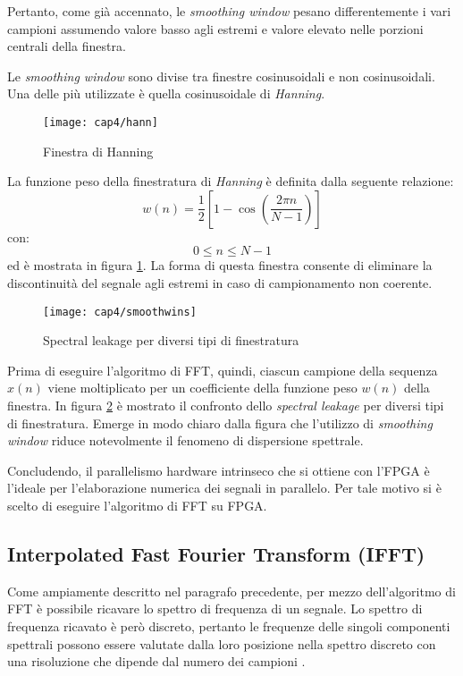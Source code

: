 Pertanto, come già accennato, le \textit{smoothing window} pesano differentemente i vari campioni assumendo valore basso agli estremi e valore elevato nelle porzioni centrali della finestra.

Le \textit{smoothing window} sono divise tra finestre cosinusoidali e non cosinusoidali. Una delle più utilizzate è quella cosinusoidale di \textit{Hanning}.
\begin{figure}[H]
  \begin{center}
    \texttt{[image: cap4/hann]}
    \caption{Finestra di Hanning}
    \label{hann}
  \end{center}
\end{figure}

La funzione peso della finestratura di \textit{Hanning} è definita dalla seguente relazione:
\begin{equation}
	w(n) = \frac{1}{2} \left [  1 - \cos \left ( \frac{2 \pi n}{N - 1} \right ) \right ]
\end{equation}
con:
$$ 0 \leq n \leq N-1 $$
ed è mostrata in figura \ref{hann}. La forma di questa finestra consente di eliminare la discontinuità del segnale agli estremi in caso di campionamento non coerente. 
\begin{figure}[H] 
  \begin{center}
    \texttt{[image: cap4/smoothwins]}
    \caption{Spectral leakage per diversi tipi di finestratura}
    \label{smoothwins}
  \end{center}
\end{figure}

Prima di eseguire l'algoritmo di FFT, quindi, ciascun campione della sequenza $x(n)$ viene moltiplicato per un coefficiente della funzione peso $w(n)$ della finestra. 
In figura \ref{smoothwins} è mostrato il confronto dello \textit{spectral leakage} per diversi tipi di finestratura. Emerge in modo chiaro dalla figura che l'utilizzo di \textit{smoothing window} riduce notevolmente il fenomeno di dispersione spettrale.

Concludendo, il parallelismo hardware intrinseco che si ottiene con l'FPGA è l'ideale per l'elaborazione numerica dei segnali in parallelo. Per tale motivo si è scelto di eseguire l'algoritmo di FFT su FPGA.

\subsection{Interpolated Fast Fourier Transform (IFFT)}
Come ampiamente descritto nel paragrafo precedente, per mezzo dell'algoritmo di FFT è possibile ricavare lo spettro di frequenza di un segnale. Lo spettro di frequenza ricavato è però discreto, pertanto le frequenze delle singoli componenti spettrali possono essere valutate dalla loro posizione nella spettro discreto con una risoluzione che dipende dal numero dei campioni \cite{31004}.

